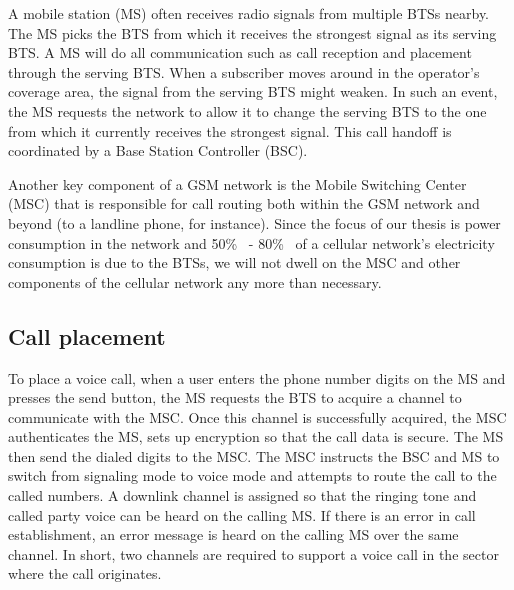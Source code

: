 A mobile station (MS) often receives radio signals from multiple BTSs nearby. The MS picks the BTS from which it receives the strongest signal as its serving BTS. A MS will do all communication such as call reception and placement through the serving BTS. When a subscriber moves around in the operator's coverage area, the signal from the serving BTS might weaken. In such an event, the MS requests the network to allow it to change the serving BTS to the one from which it currently receives the strongest signal. This call handoff is coordinated by a Base Station Controller (BSC). 

Another key component of a GSM network is the Mobile Switching Center (MSC) that is responsible for call routing both within the GSM network and beyond (to a landline phone, for instance). Since the focus of our thesis is power consumption in the network and 50\%~\cite{Louhi:2007:BTSPower:INTELEC} - 80\%~\cite{Oh:Comm:2011} of a cellular network's electricity consumption is due to the BTSs, we will not dwell on the MSC and other components of the cellular network any more than necessary.

\subsection{Call placement} %
To place a voice call, when a user enters the phone number digits on the MS and presses the send button, the MS requests the BTS to acquire a channel to communicate with the MSC. Once this channel is successfully acquired, the MSC authenticates the MS, sets up encryption so that the call data is secure. The MS then send the dialed digits to the MSC. The MSC instructs the BSC and MS to switch from signaling mode to voice mode and attempts to route the call to the called numbers. A downlink channel is assigned so that the ringing tone and called party voice can be heard on the calling MS. If there is an error in call establishment, an error message is heard on the calling MS over the same channel. In short, two channels are required to support a voice call in the sector where the call originates.

